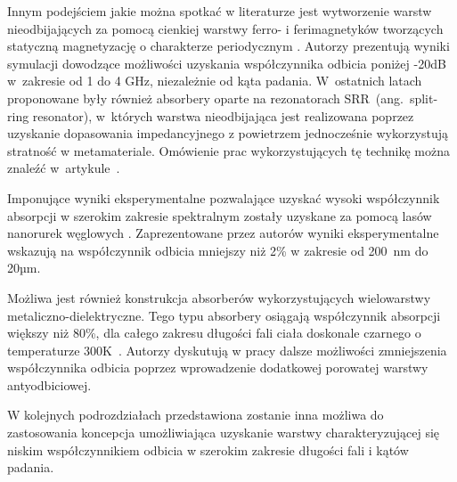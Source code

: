 Innym podejściem jakie można spotkać w literaturze jest wytworzenie warstw nieodbijających za pomocą cienkiej warstwy ferro- i ferimagnetyków tworzących  statyczną magnetyzację o charakterze periodycznym   \cite{ramprecht2008scattering}. Autorzy prezentują wyniki symulacji dowodzące możliwości uzyskania współczynnika odbicia poniżej -20dB w~zakresie od 1 do 4 GHz, niezależnie od kąta padania. W~ostatnich latach proponowane były również absorbery oparte na rezonatorach SRR~(ang.~split-ring resonator), w~których warstwa nieodbijająca jest realizowana poprzez uzyskanie dopasowania impedancyjnego z powietrzem jednocześnie wykorzystują stratność w metamateriale. Omówienie prac wykorzystujących tę technikę  można znaleźć w~artykule~\cite{watts2012metamaterial}.

Imponujące wyniki eksperymentalne pozwalające uzyskać wysoki współczynnik absorpcji w szerokim zakresie spektralnym zostały uzyskane za pomocą lasów nanorurek węglowych \cite{mizuno2009black}. Zaprezentowane przez autorów wyniki eksperymentalne wskazują na współczynnik odbicia mniejszy niż 2\% w zakresie od 200~nm do 20µm.

Możliwa jest również konstrukcja absorberów wykorzystujących wielowarstwy metaliczno-dielektryczne. Tego typu absorbery osiągają współczynnik absorpcji większy niż 80\%, dla całego zakresu długości fali ciała doskonale czarnego o temperaturze 300K~\cite{guo2014impact,corrigan2012broadband}. Autorzy dyskutują w pracy dalsze możliwości zmniejszenia współczynnika odbicia poprzez wprowadzenie dodatkowej porowatej warstwy antyodbiciowej. 

W kolejnych podrozdziałach przedstawiona zostanie inna możliwa do zastosowania koncepcja umożliwiająca uzyskanie warstwy charakteryzującej się niskim współczynnikiem odbicia w szerokim zakresie długości fali i kątów padania. 
